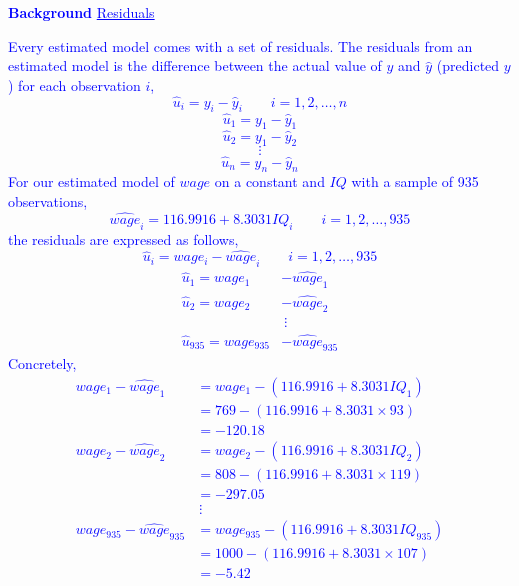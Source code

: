 \documentclass[12pt]{report}
\newenvironment{blueframed}[1][blue]
{\def\FrameCommand{\fboxsep=\FrameSep\fcolorbox{#1}{white}}%
\MakeFramed {\advance\hsize-\width \FrameRestore}}
{\endMakeFramed}
\begin{document}
\vspace{-\baselineskip}
\newpage
\justify
\begin{blueframed}
	\textcolor{blue}{\textbf{Background}}
	\vspace{-\baselineskip}
	\justify
	\textcolor{blue}{\underline{Residuals}}
	
	\noindent \textcolor{blue}
	{
		Every estimated model comes with a set of residuals. The residuals from an estimated model is the difference between the actual value of $y$ and $\hat{y}$ (predicted $y$) for each observation $i$,
		$$\hat{u}_i = y_i-\hat{y}_i \qquad i=1,2,\dots,n$$
	}
	\textcolor{blue}
	{
		$$\hat{u}_1 = y_1-\hat{y}_1$$
		$$\hat{u}_2 = y_1-\hat{y}_2$$
		$$\vdots$$
		$$\hat{u}_n = y_n-\hat{y}_n$$
		For our estimated model of $wage$ on a constant and $IQ$ with a sample of 935 observations, $$\widehat{wage}_i = 116.9916+8.3031IQ_i \qquad i=1,2,\dots,935$$ the residuals are expressed as follows,
		$$\hat{u}_i = wage_i-\widehat{wage}_i \qquad i=1,2,\dots,935$$
		\begin{align*}
		\hat{u}_1 = wage_1&-\widehat{wage}_1 \\
		\hat{u}_2 = wage_2&-\widehat{wage}_2 \\
		&\ \vdots \\
		\hat{u}_{935} = wage_{935}&-\widehat{wage}_{935}
		\end{align*}
		Concretely,
		\begin{align*}
		wage_1-\widehat{wage}_1 &= wage_1 - (116.9916+8.3031IQ_1) \\
		&= 769-(116.9916+8.3031\times93) \\
		&= -120.18 \\
		wage_2-\widehat{wage}_2 &= wage_2 - (116.9916+8.3031IQ_2) \\
		&= 808-(116.9916+8.3031\times119) \\
		&= -297.05 \\
		&\ \vdots \\
		wage_{935}-\widehat{wage}_{935} &= wage_{935} - (116.9916+8.3031IQ_{935}) \\
		&= 1000-(116.9916+8.3031\times107) \\
		&= -5.42 
		\end{align*}
	}
\end{blueframed}
\end{document}
